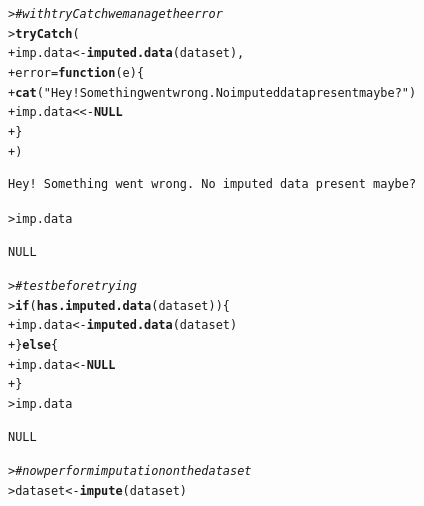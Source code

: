 \documentclass{article}\usepackage[]{graphicx}\usepackage[]{color}
\makeatletter
\newcommand{\hlstr}[1]{\textcolor[rgb]{0.192,0.494,0.8}{#1}}%
\newcommand{\hlcom}[1]{\textcolor[rgb]{0.678,0.584,0.686}{\textit{#1}}}%
\newcommand{\hlstd}[1]{\textcolor[rgb]{0.345,0.345,0.345}{#1}}%
\newcommand{\hlkwa}[1]{\textcolor[rgb]{0.161,0.373,0.58}{\textbf{#1}}}%
\newcommand{\hlkwb}[1]{\textcolor[rgb]{0.69,0.353,0.396}{#1}}%
\newcommand{\hlkwc}[1]{\textcolor[rgb]{0.333,0.667,0.333}{#1}}%
\newcommand{\hlkwd}[1]{\textcolor[rgb]{0.737,0.353,0.396}{\textbf{#1}}}%
\newenvironment{kframe}{%
 \def\at@end@of@kframe{}%
 \ifinner\ifhmode%
  \def\at@end@of@kframe{\end{minipage}}%
  \begin{minipage}{\columnwidth}%
 \fi\fi%
 \def\FrameCommand##1{\hskip\@totalleftmargin \hskip-\fboxsep
 \colorbox{shadecolor}{##1}\hskip-\fboxsep
     \hskip-\linewidth \hskip-\@totalleftmargin \hskip\columnwidth}%
 \MakeFramed {\advance\hsize-\width
   \@totalleftmargin\z@ \linewidth\hsize
   \@setminipage}}%
 {\par\unskip\endMakeFramed%
 \at@end@of@kframe}
\newenvironment{knitrout}{}{} %
\makeatother
\begin{document}
\begin{knitrout}
\begin{kframe}
{\ttfamily\noindent\bfseries\color{errorcolor}{Error in imputed.data(dataset): The dataset contains no imputed data. Please impute data before learning.\\See > ?impute for help.}}\begin{alltt}
\hlstd{> }\hlcom{# with tryCatch we manage the error}
\hlstd{> }\hlkwd{tryCatch}\hlstd{(}
\hlstd{+ }  \hlstd{imp.data} \hlkwb{<-} \hlkwd{imputed.data}\hlstd{(dataset),}
\hlstd{+ }  \hlkwc{error} \hlstd{=} \hlkwa{function}\hlstd{(}\hlkwc{e}\hlstd{) \{}
\hlstd{+ }    \hlkwd{cat}\hlstd{(}\hlstr{"Hey! Something went wrong. No imputed data present maybe?"}\hlstd{)}
\hlstd{+ }    \hlstd{imp.data} \hlkwb{<<-} \hlkwa{NULL}
\hlstd{+ }  \hlstd{\}}
\hlstd{+ }\hlstd{)}
\end{alltt}
\begin{verbatim}
Hey! Something went wrong. No imputed data present maybe?
\end{verbatim}
\begin{alltt}
\hlstd{> }\hlstd{imp.data}
\end{alltt}
\begin{verbatim}
NULL
\end{verbatim}
\begin{alltt}
\hlstd{> }\hlcom{# test before trying}
\hlstd{> }\hlkwa{if} \hlstd{(}\hlkwd{has.imputed.data}\hlstd{(dataset)) \{}
\hlstd{+ }  \hlstd{imp.data} \hlkwb{<-} \hlkwd{imputed.data}\hlstd{(dataset)}
\hlstd{+ }\hlstd{\}} \hlkwa{else} \hlstd{\{}
\hlstd{+ }  \hlstd{imp.data} \hlkwb{<-} \hlkwa{NULL}
\hlstd{+ }\hlstd{\}}
\hlstd{> }\hlstd{imp.data}
\end{alltt}
\begin{verbatim}
NULL
\end{verbatim}
\begin{alltt}
\hlstd{> }\hlcom{# now perform imputation on the dataset}
\hlstd{> }\hlstd{dataset} \hlkwb{<-} \hlkwd{impute}\hlstd{(dataset)}
\end{alltt}


{\ttfamily\noindent\itshape\color{messagecolor}{bnstruct :: performing imputation ...}}


\end{kframe}
\end{knitrout}
\end{document}

